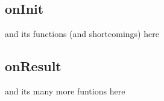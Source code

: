 \subsection{onInit}
and its functions (and shortcomings) here
\subsection{onResult}
and its many more funtions here
